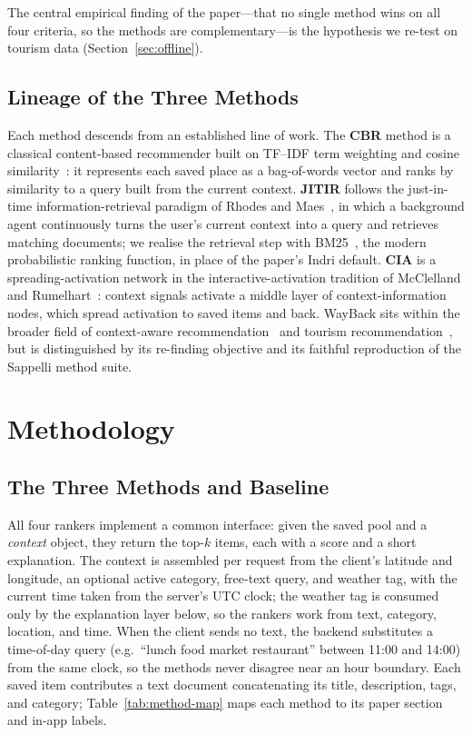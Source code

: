 \documentclass[acmlarge]{acmart}
\begin{document}
The central empirical finding of the paper---that no single method wins on
all four criteria, so the methods are complementary---is the hypothesis we
re-test on tourism data (Section~\ref{sec:offline}).

\subsection{Lineage of the Three Methods}
Each method descends from an established line of work. The \textbf{CBR}
method is a classical content-based recommender built on TF--IDF
term weighting and cosine similarity~\cite{salton1988tfidf}: it represents
each saved place as a bag-of-words vector and ranks by similarity to a
query built from the current context. \textbf{JITIR} follows the
just-in-time information-retrieval paradigm of Rhodes and
Maes~\cite{rhodes2000jitir}, in which a background agent continuously turns
the user's current context into a query and retrieves matching documents;
we realise the retrieval step with BM25~\cite{robertson2009bm25}, the
modern probabilistic ranking function, in place of the paper's Indri
default. \textbf{CIA} is a spreading-activation network in the interactive-activation
tradition of McClelland and Rumelhart~\cite{mcclelland1981iac}: context
signals activate a middle layer of context-information nodes, which spread
activation to saved items and back. WayBack sits within the broader field
of context-aware recommendation~\cite{adomavicius2011context} and tourism
recommendation~\cite{borras2014tourism}, but is distinguished by its
re-finding objective and its faithful reproduction of the Sappelli method
suite.

\section{Methodology}
\label{sec:methodology}

\subsection{The Three Methods and Baseline}
\label{sec:methods}

All four rankers implement a common interface: given the saved pool and a
\emph{context} object, they return the top-$k$ items, each with a score
and a short explanation. The context is assembled per request from the
client's latitude and longitude, an optional active category, free-text
query, and weather tag, with the current time taken from the server's UTC
clock; the weather tag is consumed only by the explanation layer below,
so the rankers work from text, category, location, and time. When the
client sends no text, the backend substitutes a time-of-day query (e.g.\
``lunch food market restaurant'' between 11:00 and 14:00) from the same
clock, so the methods never disagree near an hour boundary. Each saved
item contributes a text document concatenating its title, description,
tags, and category; Table~\ref{tab:method-map} maps each method to its
paper section and in-app labels.
\end{document}
